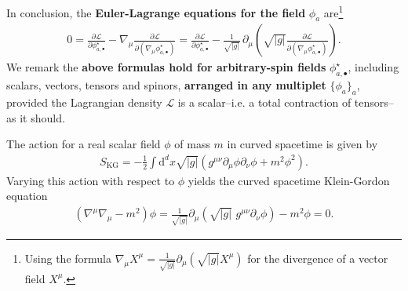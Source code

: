 \begin{mytheorem}
In conclusion, the \textbf{Euler-Lagrange equations for the field} $\phi_a$ are\footnote{Using the formula $\nabla_\mu X^\mu = \frac{1}{\sqrt{|g|}}\partial_\mu (\sqrt{|g|} X^\mu)$ for the divergence of a vector field $X^\mu$.}
\begin{align}
    0= \frac{\partial\mathcal{L}}{\partial\phi^\star_{a,\bullet}}-\nabla_\mu \frac{\partial \mathcal{L}}{\partial (\nabla_\mu \phi_{a,\bullet}^\star)}
    =\frac{\partial\mathcal{L}}{\partial\phi^\star_{a,\bullet}}-\frac{1}{\sqrt{|g|}} \,\partial_\mu \left( \sqrt{|g|} \frac{\partial \mathcal{L}}{\partial (\nabla_\mu \phi_{a,\bullet}^\star)} \right).
\end{align}
We remark the \textbf{above formulas hold for arbitrary-spin fields} $\phi^{\star}_{a,\bullet}$, including scalars, vectors, tensors and spinors, \textbf{arranged in any multiplet} $\{\phi_a\}_a$, provided the Lagrangian density $\mathcal{L}$ is a scalar--i.e. a total contraction of tensors--as it should.
\end{mytheorem}



\begin{mytheorem}
The action for a real scalar field $\phi$ of mass $m$ in curved spacetime is given by
\begin{align}
    S_\text{KG} = -\frac{1}{2} \int \mathrm{d}^d x \sqrt{|g|} \left( g^{\mu\nu} \partial_\mu \phi \partial_\nu \phi + m^2 \phi^2 \right).
\end{align}
Varying this action with respect to $\phi$ yields the curved spacetime Klein-Gordon equation
\begin{align}
    (\nabla^\mu \nabla_\mu - m^2) \phi = \frac{1}{\sqrt{|g|}} \partial_\mu \left( \sqrt{|g|}\,\, g^{\mu\nu} \partial_\nu \phi \right) - m^2 \phi = 0.
\end{align}
%   
\end{mytheorem}


